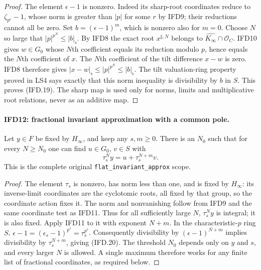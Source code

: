 \documentclass[11pt,a4paper]{article}
\numberwithin{equation}{section}
\theoremstyle{remark}\newtheorem{remark}[theorem]{Remark}
\begin{document}
\begin{proof}
The element $\epsilon-1$ is nonzero. Indeed its sharp-root
coordinates reduce to $\zeta_{p^r}-1$, whose norm is greater than
$|p|$ for some $r$ by IFD9; their reductions cannot all be zero.
Set $b=(\epsilon-1)^m$, which is nonzero also for $m=0$.
Choose $N$ so large that $|p|^{p^N}\leq|b|_\flat$.
By IFD8 the exact root $x^{\sharp,N}$ belongs to
$\widehat{K_\infty}\cap\mathcal O_C$.
IFD10 gives $w\in G_0$ whose $N$th coefficient equals its
reduction modulo $p$, hence equals the $N$th coefficient of $x$.
The $N$th coefficient of the tilt difference $x-w$ is zero.
IFD8 therefore gives $|x-w|_\flat\leq|p|^{p^N}\leq|b|_\flat$.
The tilt valuation-ring property proved in LS4 says exactly that
this norm inequality is divisibility by $b$ in $S$.
This proves (IFD.19). The sharp map is used only for norms,
limits and multiplicative root relations, never as an additive map.
\end{proof}

\paragraph{IFD12: fractional invariant approximation with a common pole.}
\label{claim:IFD12}
Let $y\in F$ be fixed by $H_\infty$, and keep any $s,m\geq0$.
There is an $N_0$ such that for every $N\geq N_0$ one can find
$u\in G_0$, $v\in S$ with
\[
                         \tau_s^N y=u+\tau_s^{N+m}v.
                                                               \tag{IFD.20}
\]
This is the complete original \texttt{flat\_\allowbreak invariant\_\allowbreak approx} scope.

\begin{proof}
The element $\tau_s$ is nonzero, has norm less than one, and is
fixed by $H_\infty$: its inverse-limit coordinates are the
cyclotomic roots, all fixed by that group, so the coordinate action
fixes it. The norm and nonvanishing follow from IFD9 and the same
coordinate test as IFD11. Thus for all sufficiently large $N$,
$\tau_s^N y$ is integral; it is also fixed.
Apply IFD11 to it with exponent $N+m$.
In the characteristic-$p$ ring $S$,
$\epsilon-1=(\epsilon_s-1)^{p^s}=\tau_s^{p^s}$.
Consequently divisibility by $(\epsilon-1)^{N+m}$ implies
divisibility by $\tau_s^{N+m}$, giving (IFD.20).
The threshold $N_0$ depends only on $y$ and $s$, and every larger
$N$ is allowed. A single maximum therefore works for any finite
list of fractional coordinates, as required below.
\end{proof}
\end{document}
